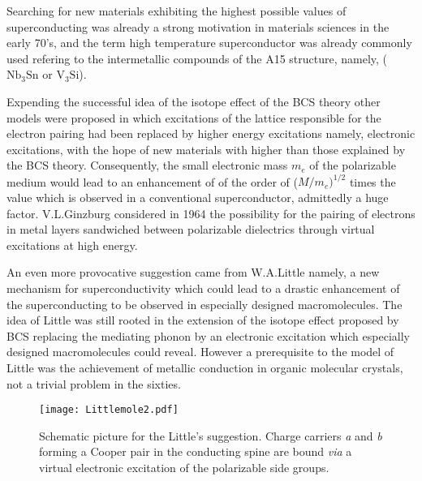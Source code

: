 \documentclass[11pt]{article} %
\begin{document}
Searching for new materials exhibiting the highest possible values of superconducting \tc was already a  strong motivation in materials sciences in the early 70's,  and the term high temperature superconductor was already commonly used refering
to the intermetallic compounds of the A15 structure, namely, ($\mathrm{Nb_{3}Sn}$ or $\mathrm{V_{3}Si}$)\cite{Hardy54}.

Expending the successful idea of the isotope effect of the BCS theory  other models were proposed in which excitations of the lattice responsible for the electron pairing had been replaced by higher energy excitations namely, electronic excitations, with the hope of  new  materials with  \tc higher than those explained by the BCS theory.
Consequently, the small electronic mass
$m_e$ of the polarizable medium would lead  to an enhancement of
\tc of the order of  ($M/m_e)^{1/2}$ times the value which is observed  in a conventional superconductor, admittedly a huge factor. V.L.Ginzburg\cite{Ginzburg64a,Ginzburg64b} considered in 1964 the possibility for the pairing of electrons in
metal layers sandwiched between polarizable dielectrics through virtual excitations at high energy. 

An even more provocative suggestion came from W.A.Little
\cite{Little64,Little65}namely,
 a new mechanism  for superconductivity which could lead to a drastic enhancement of the superconducting \tc
 to be observed in especially designed macromolecules. The idea of Little
was still rooted in the extension of the isotope effect proposed by BCS replacing the  mediating phonon by an electronic excitation which especially designed macromolecules could reveal. However a prerequisite to the model of Little was the achievement of metallic conduction in organic molecular crystals, not a trivial problem in the sixties.
 \begin{figure}[ht]			
\centerline{\texttt{[image: Littlemole2.pdf]}}
\caption{Schematic picture for the  Little's suggestion.  Charge carriers \textit{a} and \textit{b} forming a Cooper pair in the conducting spine are bound
\textit{via} a virtual electronic excitation of  the polarizable side groups. }
\label{Littlemole2.pdf}
\end{figure} 
\end{document}
